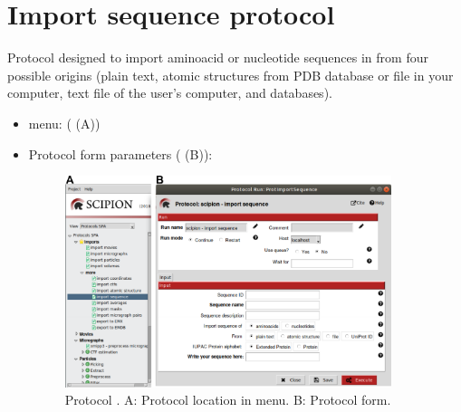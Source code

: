 \section{Import sequence protocol}
\label{app:importSequence}%
Protocol designed to import aminoacid or nucleotide sequences in \scipion from four possible origins (plain text, atomic structures from PDB database or file in your computer, text file of the user's computer, and  databases).

\begin{itemize}
  \item \scipion menu:
   ( (A))
  
  \item Protocol form parameters ( (B)):
  
  \begin{figure}[H]
    \centering 
    \captionsetup{width=.7\linewidth} 
    \includegraphics[width=0.90\textwidth]{Images_appendix/Fig104.pdf}
    \caption{Protocol . A: Protocol location in \scipion menu. B: Protocol form.}
    \label{fig:app_protocol_sequence_1}
   \end{figure}
  

\end{itemize}
